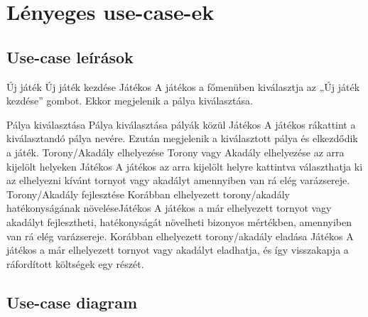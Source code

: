 \section{Lényeges use-case-ek}
\subsection{Use-case leírások}


\usecase
{Új játék}
{Új játék kezdése}
{Játékos}
{A játékos a főmenüben kiválasztja az „Új játék kezdése” gombot. Ekkor megjelenik a pálya kiválasztása.}

\usecase
{Pálya kiválasztása
}{Pálya kiválasztása pályák közül}
{Játékos}
{A játékos rákattint a kiválasztandó pálya nevére. Ezután megjelenik a kiválasztott pálya és elkezdődik a játék.}
\usecase
{Torony/Akadály elhelyezése}
{Torony vagy Akadály elhelyezése az arra kijelölt helyeken}
{Játékos}
{A játékos az arra kijelölt helyre kattintva választhatja ki az elhelyezni kívánt tornyot vagy akadályt amennyiben van rá elég varázsereje. }
\usecase
{Torony/Akadály fejlesztése}
{Korábban elhelyezett torony/akadály hatékonyságának növelése}{Játékos}
{A játékos a már elhelyezett tornyot vagy akadályt fejlesztheti, hatékonyságát növelheti bizonyos mértékben, amennyiben van rá elég varázsereje.}
{Korábban elhelyezett torony/akadály eladása}
{Játékos}
{A játékos a már elhelyezett tornyot vagy akadályt eladhatja, és így visszakapja a ráfordított költségek egy részét.}
\subsection{Use-case diagram}

